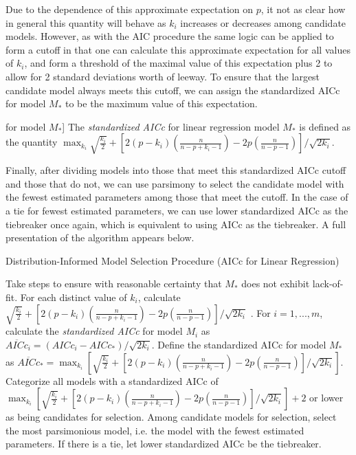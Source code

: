 		Due to the dependence of this approximate expectation on $p$, it not as clear how in general this quantity will behave as $k_i$ increases
		or decreases among candidate models. However, as with the AIC procedure the same logic can be applied to form a cutoff in that one can calculate this approximate
		expectation for all values of $k_i$, and form a threshold of the maximal value of this expectation plus 2 to allow for 2 standard deviations
		worth of leeway. To ensure that the largest candidate model always meets this cutoff, we can assign the standardized AICc for model $M_*$
		to be the maximum value of this expectation.
		\begin{definition}[Standardized AICc [linear regression] for model $M_*$]
			The \textit{standardized AICc} for linear regression model $M_*$ is defined as the quantity
			$\max_{k_i} \sqrt{\frac{k_i}{2}} + \left[ 2(p-k_i) \left( \frac{n}{n-p+k_i-1} \right) - 2p \left( \frac{n}{n-p-1} \right) \right] / \sqrt{2k_i}$.
		\end{definition}

		Finally, after dividing models into those that meet this standardized AICc cutoff and those that do not, we can use parsimony to select
		the candidate model with the fewest estimated parameters among those that meet the cutoff. In the case of a tie for fewest estimated parameters, we can
		use lower standardized AICc as the tiebreaker once again, which is equivalent to using AICc as the tiebreaker. A full presentation of
		the algorithm appears below.

		\begin{algorithm}[H]
			\caption{Distribution-Informed Model Selection Procedure (AICc for Linear Regression)}
			\begin{algorithmic}[1]
			  \State Take steps to ensure with reasonable certainty that $M_*$ does not exhibit lack-of-fit.
			  \State For each distinct value of $k_i$, calculate
			  \Statex $\sqrt{\frac{k_i}{2}} + \left[ 2(p-k_i) \left( \frac{n}{n-p+k_i-1} \right) - 2p \left( \frac{n}{n-p-1} \right) \right] / \sqrt{2k_i}$ .
			  \State For $i = 1,...,m$, calculate the \textit{standardized AICc} for model $M_i$ as 
			  $\overline{AICc}_i = (AICc_i - AICc_*) / \sqrt{2k_i}$. Define the standardized AICc for model
			  $M_*$ as $\overline{AICc}_* = \max_{k_i} \left[ \sqrt{\frac{k_i}{2}} + \left[ 2(p-k_i) \left( \frac{n}{n-p+k_i-1} \right) - 2p \left( \frac{n}{n-p-1} \right) \right] / \sqrt{2k_i} \right]$.
			  \State Categorize all models with a standardized AICc of
			  $ \max_{k_i} \left[ \sqrt{\frac{k_i}{2}} + \left[ 2(p-k_i) \left( \frac{n}{n-p+k_i-1} \right) - 2p \left( \frac{n}{n-p-1} \right) \right] / \sqrt{2k_i} \right] + 2$
			  or lower as being candidates for selection.
			  \State Among candidate models for selection, select the most parsimonious model, i.e. the model
			  with the fewest estimated parameters. If there is a tie, let lower standardized AICc be the
			  tiebreaker.
			\end{algorithmic}
		\end{algorithm}

